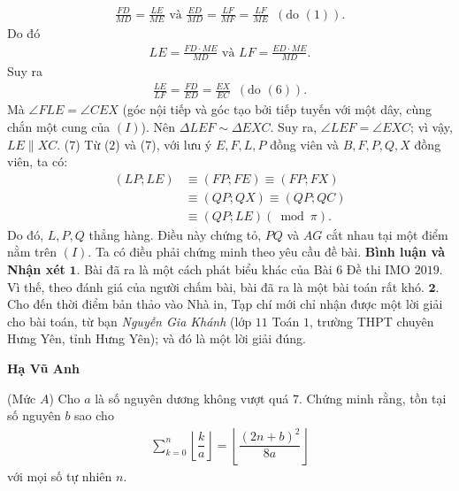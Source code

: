 \begin{multicols}{2}
	\begin{align*}
		\frac{{FD}}{{MD}} \!=\! \frac{{LE}}{{ME}} \text{ và } \frac{{ED}}{{MD}} \!=\! \frac{{LF}}{{MF}} \!=\! \frac{{LF}}{{ME}}\,\,\,({\text{do }}(1)).
	\end{align*} 
	Do đó
	\begin{align*}
		LE = \frac{{FD \cdot ME}}{{MD}} \text{ và } LF = \frac{{ED \cdot ME}}{{MD}}.
	\end{align*}
	Suy ra
	\begin{align*}
		\frac{{LE}}{{LF}} = \frac{{FD}}{{ED}} = \frac{{EX}}{{EC}}\,\,\,({\text{do }}(6)).
	\end{align*}
	Mà $\angle FLE = \angle CEX$ (góc nội tiếp và góc tạo bởi tiếp tuyến với một dây, cùng chắn một cung của $(I)$).
	\vskip 0.1cm
	Nên $\Delta LEF \sim \Delta EXC$. Suy ra, $\angle LEF = \angle EXC$; vì vậy, $LE \parallel XC$. \hfill ($7$)
	\vskip 0.05cm
	Từ ($2$) và ($7$), với lưu ý $E, F, L, P$ đồng viên và $B, F, P, Q, X$ đồng viên, ta có:
	\begin{align*}
		\left( {LP;LE} \right) &\equiv \left( {FP;FE} \right) \equiv \left( {FP;FX} \right) \\
		&\equiv \left( {QP;QX} \right) \equiv \left( {QP;QC} \right) \\
		&\equiv \left( {QP;LE} \right)\left( {\bmod \pi } \right).
	\end{align*}
	Do đó, $L, P, Q$ thẳng hàng. Điều này chứng tỏ, $PQ$ và $AG$ cắt nhau tại một điểm nằm trên $(I)$.
	\vskip 0.05cm
	Ta có điều phải chứng minh theo yêu cầu đề bài.
	\vskip 0.05cm
	\textbf{\color{thachthuctoanhoc}Bình luận và Nhận xét}
	\vskip 0.05cm
	$\pmb{1.}$ Bài đã ra là một cách phát biểu khác của Bài $6$ Đề thi IMO $2019$. Vì thế, theo đánh giá của người chấm bài, bài đã ra là một bài toán rất khó.
	\vskip 0.05cm
	$\pmb{2.}$ Cho đến thời điểm bản thảo vào Nhà in, Tạp chí mới chỉ nhận được một lời giải cho bài toán, từ bạn \textit{Nguyễn Gia Khánh} (lớp $11$ Toán $1$, trường THPT chuyên Hưng Yên, tỉnh Hưng Yên); và đó là một lời giải đúng.
	\begin{flushright}
		\textbf{\color{thachthuctoanhoc}Hạ Vũ Anh}
	\end{flushright}
	{}
	(Mức $A$) Cho $a$ là số nguyên dương không vượt quá $7$. Chứng minh rằng, tồn tại số nguyên $b$ sao cho
	\begin{align*}
		\sum\limits_{k=0}^n\left\lfloor\dfrac ka\right\rfloor=\left\lfloor\dfrac {(2n+b)^2}{8a}\right\rfloor
	\end{align*}
	với mọi số tự nhiên $n$.

\end{multicols}
